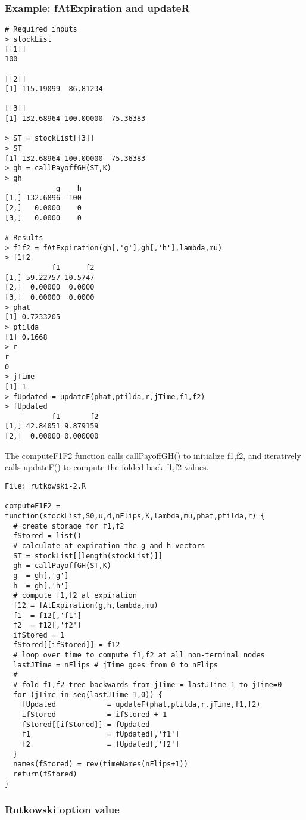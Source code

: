 \documentclass[10pt]{article}
\begin{document}
\subsubsection*{Example: fAtExpiration and updateR}

\begin{verbatim}
# Required inputs
> stockList
[[1]]
100

[[2]]
[1] 115.19099  86.81234

[[3]]
[1] 132.68964 100.00000  75.36383

> ST = stockList[[3]]
> ST
[1] 132.68964 100.00000  75.36383
> gh = callPayoffGH(ST,K)
> gh
            g    h
[1,] 132.6896 -100
[2,]   0.0000    0
[3,]   0.0000    0

# Results
> f1f2 = fAtExpiration(gh[,'g'],gh[,'h'],lambda,mu)
> f1f2
           f1      f2
[1,] 59.22757 10.5747
[2,]  0.00000  0.0000
[3,]  0.00000  0.0000
> phat
[1] 0.7233205
> ptilda
[1] 0.1668
> r
r
0
> jTime
[1] 1
> fUpdated = updateF(phat,ptilda,r,jTime,f1,f2)
> fUpdated
           f1       f2
[1,] 42.84051 9.879159
[2,]  0.00000 0.000000
\end{verbatim}


The computeF1F2 function calls callPayoffGH() to initialize f1,f2, and
iteratively calls updateF() to compute the folded back f1,f2 values.

\begin{verbatim}
File: rutkowski-2.R

computeF1F2 = function(stockList,S0,u,d,nFlips,K,lambda,mu,phat,ptilda,r) {
  # create storage for f1,f2
  fStored = list()
  # calculate at expiration the g and h vectors
  ST = stockList[[length(stockList)]]
  gh = callPayoffGH(ST,K)
  g  = gh[,'g']
  h  = gh[,'h']
  # compute f1,f2 at expiration
  f12 = fAtExpiration(g,h,lambda,mu)
  f1  = f12[,'f1']
  f2  = f12[,'f2']
  ifStored = 1
  fStored[[ifStored]] = f12
  # loop over time to compute f1,f2 at all non-terminal nodes
  lastJTime = nFlips # jTime goes from 0 to nFlips
  #
  # fold f1,f2 tree backwards from jTime = lastJTime-1 to jTime=0
  for (jTime in seq(lastJTime-1,0)) {
    fUpdated            = updateF(phat,ptilda,r,jTime,f1,f2)
    ifStored            = ifStored + 1
    fStored[[ifStored]] = fUpdated
    f1                  = fUpdated[,'f1']
    f2                  = fUpdated[,'f2']
  }
  names(fStored) = rev(timeNames(nFlips+1))
  return(fStored)
}
\end{verbatim}

\subsubsection*{Rutkowski option value}
\end{document}
